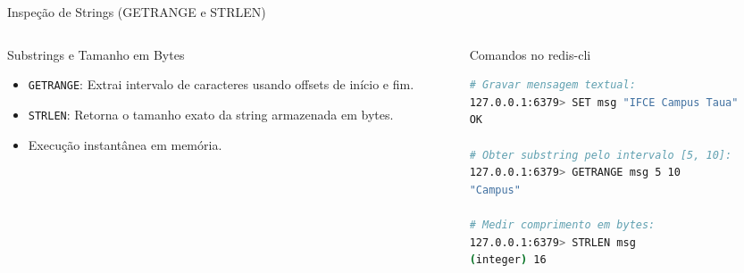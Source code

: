 \begin{frame}[fragile]{Inspeção de Strings (GETRANGE e STRLEN)}
  \begin{columns}[T]
    \begin{column}{0.48\textwidth}
      \alert{Substrings e Tamanho em Bytes}\par
      \small
      \begin{itemize}
        \item \texttt{GETRANGE}: Extrai intervalo de caracteres usando offsets de início e fim.
        \item \texttt{STRLEN}: Retorna o tamanho exato da string armazenada em bytes.
        \item Execução instantânea em memória.
      \end{itemize}
    \end{column}
    \begin{column}{0.50\textwidth}
      \alert{Comandos no redis-cli}\par
      \begin{lstlisting}[language=bash]
# Gravar mensagem textual:
127.0.0.1:6379> SET msg "IFCE Campus Taua"
OK

# Obter substring pelo intervalo [5, 10]:
127.0.0.1:6379> GETRANGE msg 5 10
"Campus"

# Medir comprimento em bytes:
127.0.0.1:6379> STRLEN msg
(integer) 16
      \end{lstlisting}
    \end{column}
  \end{columns}
\end{frame}
